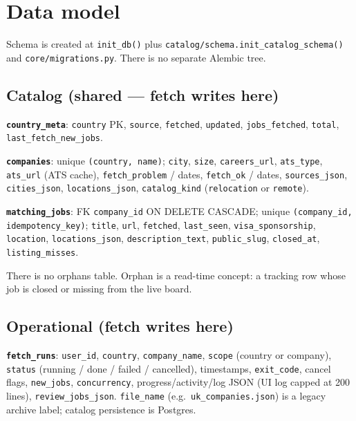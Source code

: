 \documentclass[11pt,a4paper]{article}
\begin{document}
\section{Data model}

Schema is created at \texttt{init\_db()} plus
\texttt{catalog/schema.init\_catalog\_schema()} and
\texttt{core/migrations.py}. There is no separate Alembic tree.

\subsection{Catalog (shared --- fetch writes here)}

\textbf{\texttt{country\_meta}}: \texttt{country} PK, \texttt{source},
\texttt{fetched}, \texttt{updated}, \texttt{jobs\_fetched}, \texttt{total},
\texttt{last\_fetch\_new\_jobs}.

\textbf{\texttt{companies}}: unique \texttt{(country, name)}; \texttt{city},
\texttt{size}, \texttt{careers\_url}, \texttt{ats\_type}, \texttt{ats\_url}
(ATS cache), \texttt{fetch\_problem} / dates, \texttt{fetch\_ok} / dates,
\texttt{sources\_json}, \texttt{cities\_json}, \texttt{locations\_json},
\texttt{catalog\_kind} (\texttt{relocation} or \texttt{remote}).

\textbf{\texttt{matching\_jobs}}: FK \texttt{company\_id} ON DELETE CASCADE;
unique \texttt{(company\_id, idempotency\_key)}; \texttt{title}, \texttt{url},
\texttt{fetched}, \texttt{last\_seen}, \texttt{visa\_sponsorship},
\texttt{location}, \texttt{locations\_json}, \texttt{description\_text},
\texttt{public\_slug}, \texttt{closed\_at}, \texttt{listing\_misses}.

There is no orphans table. Orphan is a read-time concept: a tracking row whose
job is closed or missing from the live board.

\subsection{Operational (fetch writes here)}

\textbf{\texttt{fetch\_runs}}: \texttt{user\_id}, \texttt{country},
\texttt{company\_name}, \texttt{scope} (country or company), \texttt{status}
(running / done / failed / cancelled), timestamps, \texttt{exit\_code},
cancel flags, \texttt{new\_jobs}, \texttt{concurrency}, progress/activity/log
JSON (UI log capped at 200 lines), \texttt{review\_jobs\_json}.
\texttt{file\_name} (e.g.\ \texttt{uk\_companies.json}) is a legacy archive
label; catalog persistence is Postgres.
\end{document}
